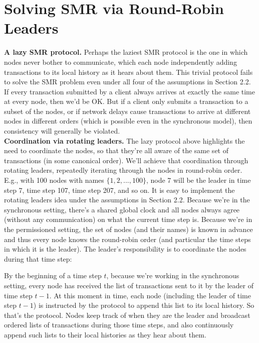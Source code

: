 \newpage
\section{Solving SMR via Round-Robin Leaders}
\noindent
\textbf{A lazy SMR protocol.} Perhaps the laziest SMR protocol is the one in which nodes
never bother to communicate, which each node independently adding transactions to its
local history as it hears about them. This trivial protocol fails to solve the SMR problem
even under all four of the assumptions in Section 2.2. If every transaction submitted by a client
always arrives at exactly the same time at every node, then we’d be OK. But if a client only
submits a transaction to a subset of the nodes, or if network delays cause transactions to
arrive at different nodes in different orders (which is possible even in the synchronous model),
then consistency will generally be violated.\\

\noindent
\textbf{Coordination via rotating leaders.} The lazy protocol above highlights the need to coordinate the nodes, so that they’re all aware of the same set of transactions (in some canonical
order). We’ll achieve that coordination through rotating leaders, repeatedly iterating through
the nodes in round-robin order. E.g., with 100 nodes with names $\{1, 2, . . . , 100\}$, node 7 will
be the leader in time step 7, time step 107, time step 207, and so on.
It is easy to implement the rotating leaders idea under the assumptions in Section 2.2.
Because we’re in the synchronous setting, there’s a shared global clock and all nodes always
agree (without any communication) on what the current time step is. Because we’re in the
permissioned setting, the set of nodes (and their names) is known in advance and thus every
node knows the round-robin order (and particular the time steps in which it is the leader).
The leader’s responsibility is to coordinate the nodes during that time step:

By the beginning of a time step $t$, because we’re working in the synchronous setting, every
node has received the list of transactions sent to it by the leader of time step $t - 1$. At this
moment in time, each node (including the leader of time step $t - 1$) is instructed by the
protocol to append this list to its local history.
So that’s the protocol. Nodes keep track of when they are the leader and broadcast
ordered lists of transactions during those time steps, and also continuously append such lists
to their local histories as they hear about them.\\

